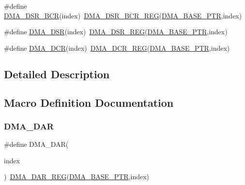 \begin{DoxyCompactItemize}
\item 
\#define \hyperlink{group___d_m_a___register___accessor___macros_ga2e7c37909967bf1dbef49c5dd36a4630}{D\+M\+A\+\_\+\+D\+S\+R\+\_\+\+B\+CR}(index)~\hyperlink{group___d_m_a___register___accessor___macros_gaa208e6c9ac3914ff9670b27aa2a6bd80}{D\+M\+A\+\_\+\+D\+S\+R\+\_\+\+B\+C\+R\+\_\+\+R\+EG}(\hyperlink{group___d_m_a___peripheral_ga6997fbc1b1973e9f27170217a3bd6f22}{D\+M\+A\+\_\+\+B\+A\+S\+E\+\_\+\+P\+TR},index)
\item 
\#define \hyperlink{group___d_m_a___register___accessor___macros_ga1d8dce59fe1bc14c72aae4eb53e8242e}{D\+M\+A\+\_\+\+D\+SR}(index)~\hyperlink{group___d_m_a___register___accessor___macros_ga8917566774c0e389162780e01c2dfe57}{D\+M\+A\+\_\+\+D\+S\+R\+\_\+\+R\+EG}(\hyperlink{group___d_m_a___peripheral_ga6997fbc1b1973e9f27170217a3bd6f22}{D\+M\+A\+\_\+\+B\+A\+S\+E\+\_\+\+P\+TR},index)
\item 
\#define \hyperlink{group___d_m_a___register___accessor___macros_ga4b180d4e51dbf0b420d8ddb03cd2fa48}{D\+M\+A\+\_\+\+D\+CR}(index)~\hyperlink{group___d_m_a___register___accessor___macros_gae8a6edbedff5e645a72bea01af62b38b}{D\+M\+A\+\_\+\+D\+C\+R\+\_\+\+R\+EG}(\hyperlink{group___d_m_a___peripheral_ga6997fbc1b1973e9f27170217a3bd6f22}{D\+M\+A\+\_\+\+B\+A\+S\+E\+\_\+\+P\+TR},index)
\end{DoxyCompactItemize}


\subsection{Detailed Description}


\subsection{Macro Definition Documentation}
\mbox{\label{group___d_m_a___register___accessor___macros_ga12c5436caa647bcc151869ce8dd11ae9}} 
\subsubsection{\texorpdfstring{D\+M\+A\+\_\+\+D\+AR}{DMA\_DAR}}
{\footnotesize\ttfamily \#define D\+M\+A\+\_\+\+D\+AR(\begin{DoxyParamCaption}\item[{}]{index }\end{DoxyParamCaption})~\hyperlink{group___d_m_a___register___accessor___macros_ga89d9e3b09d60594f95d15b03c11d4e1e}{D\+M\+A\+\_\+\+D\+A\+R\+\_\+\+R\+EG}(\hyperlink{group___d_m_a___peripheral_ga6997fbc1b1973e9f27170217a3bd6f22}{D\+M\+A\+\_\+\+B\+A\+S\+E\+\_\+\+P\+TR},index)}

